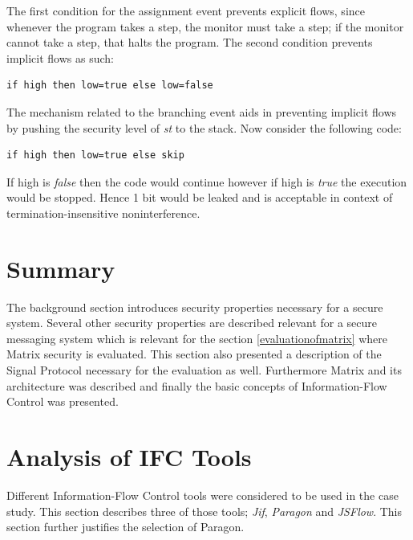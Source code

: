 The first condition for the assignment event prevents explicit flows, since whenever the program takes a step, the monitor must take a step; if the monitor cannot take a step, that halts the program. The second condition prevents implicit flows as such: 

\begin{lstlisting}
if high then low=true else low=false
\end{lstlisting}

The mechanism related to the branching event aids in preventing implicit flows by pushing the security level of \emph{st} to the stack. Now consider the following code: 

\begin{lstlisting}
if high then low=true else skip
\end{lstlisting}

If high is \emph{false} then the code would continue however if high is \emph{true} the execution would be stopped. Hence 1 bit would be leaked and is acceptable in context of termination-insensitive noninterference.

\section{Summary}
The background section introduces security properties necessary for a secure system. Several other security properties are described relevant for a secure messaging system which is relevant for the section \ref{evaluationofmatrix} where Matrix security is evaluated. This section also presented a description of the Signal Protocol necessary for the evaluation as well. Furthermore Matrix and its architecture was described and finally the basic concepts of Information-Flow Control was presented.


\section{Analysis of IFC Tools}



Different Information-Flow Control tools were considered to be used in the case study. This section describes three of those tools; \emph{Jif}, \emph{Paragon} and \emph{JSFlow}. This section further justifies the selection of Paragon.

